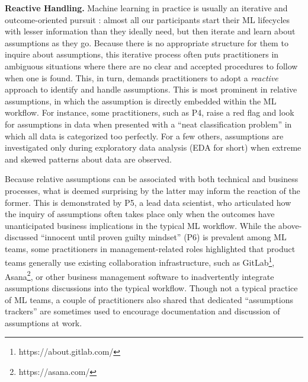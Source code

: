 \smallskip
\noindent \textbf{Reactive Handling.} Machine learning in practice is usually an iterative and outcome-oriented pursuit \cite{ashmore2021assuring,malik2020hierarchy}: almost all our participants start their ML lifecycles with lesser information than they ideally need, but then iterate and learn about assumptions as they go. Because there is no appropriate structure for them to inquire about assumptions, this iterative process often puts practitioners in ambiguous situations where there are no clear and accepted procedures to follow when one is found. This, in turn, demands practitioners to adopt a \textit{reactive} approach to identify and handle assumptions. This is most prominent in relative assumptions, in which the assumption is directly embedded within the ML workflow. For instance, some practitioners, such as P4, raise a red flag and look for assumptions in data when presented with a ``neat classification problem'' in which all data is categorized too perfectly. For a few others, assumptions are investigated only during exploratory data analysis (EDA for short) when extreme and skewed patterns about data are observed. 
\begin{quote}
    \textit{}
\end{quote}

Because relative assumptions can be associated with both technical and business processes, what is deemed surprising by the latter may inform the reaction of the former. This is demonstrated by P5, a lead data scientist, who articulated how the inquiry of assumptions often takes place only when the outcomes have unanticipated business implications in the typical ML workflow.
While the above-discussed ``innocent until proven guilty mindset'' (P6) is prevalent among ML teams, some practitioners in management-related roles highlighted that product teams generally use existing collaboration infrastructure, such as GitLab\footnote{https://about.gitlab.com/}, Asana\footnote{https://asana.com/}, or other business management software to inadvertently integrate assumptions discussions into the typical workflow. Though not a typical practice of ML teams, a couple of practitioners also shared that dedicated ``assumptions trackers'' are sometimes used to encourage documentation and discussion of assumptions at work. 

